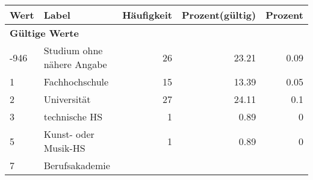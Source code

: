     \begin{longtable}{lXrrr}
     \toprule
     \textbf{Wert} & \textbf{Label} & \textbf{Häufigkeit} & \textbf{Prozent(gültig)} & \textbf{Prozent} \\
     \endhead
     \midrule
     \multicolumn{5}{l}{\textbf{Gültige Werte}}\\

     -946 &
     \multicolumn{1}{X}{ Studium ohne nähere Angabe   } &


       \num{26} &
       \num[round-mode=places,round-precision=2]{23,21} &
         \num[round-mode=places,round-precision=2]{0,09} \\

     1 &
     \multicolumn{1}{X}{ Fachhochschule   } &


       \num{15} &
       \num[round-mode=places,round-precision=2]{13,39} &
         \num[round-mode=places,round-precision=2]{0,05} \\

     2 &
     \multicolumn{1}{X}{ Universität   } &


       \num{27} &
       \num[round-mode=places,round-precision=2]{24,11} &
         \num[round-mode=places,round-precision=2]{0,1} \\

     3 &
     \multicolumn{1}{X}{ technische HS   } &


       \num{1} &
       \num[round-mode=places,round-precision=2]{0,89} &
         \num[round-mode=places,round-precision=2]{0} \\

     5 &
     \multicolumn{1}{X}{ Kunst- oder Musik-HS   } &


       \num{1} &
       \num[round-mode=places,round-precision=2]{0,89} &
         \num[round-mode=places,round-precision=2]{0} \\

     7 &
     \multicolumn{1}{X}{ Berufsakademie   } &



\end{longtable}
